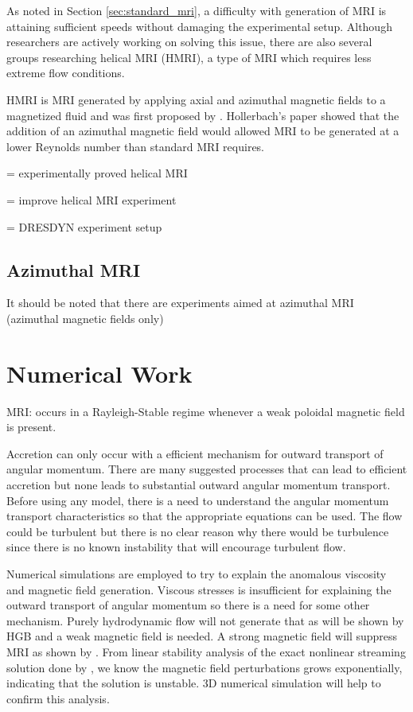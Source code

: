\documentclass{jfm}
\begin{document}
As noted in Section \ref{sec:standard_mri}, a difficulty with generation of
MRI is attaining sufficient speeds without damaging the experimental setup. 
Although researchers are actively working on solving this issue, there are also
several groups researching helical MRI (HMRI), a type of MRI which requires 
less extreme flow conditions.

HMRI is MRI generated by applying axial and azimuthal magnetic fields to a 
magnetized fluid and was first proposed by \cite{Hollerbach2005}. Hollerbach's
paper showed that the addition of an azimuthal magnetic field would allowed MRI
to be generated at a lower Reynolds number than standard MRI requires.


\cite{Stefani2006, Stefani2007}  = experimentally proved helical MRI

\cite{Stefani2009} = improve helical MRI experiment

\cite{Stefani2012} = DRESDYN experiment setup


%
%
\subsection{Azimuthal MRI}

It should be noted that there are experiments aimed at azimuthal MRI (azimuthal magnetic fields only)




\section{Numerical Work}

MRI: occurs in a Rayleigh-Stable regime whenever a weak poloidal magnetic 
field is present.

Accretion can only occur with a efficient mechanism for outward transport of 
angular momentum. There are many suggested processes that can lead to efficient
accretion but none leads to substantial outward angular momentum transport. 
Before using any model, there is a need to understand the angular momentum 
transport characteristics so that the appropriate equations can be used. The 
flow could be turbulent but there is no clear reason why there would be 
turbulence since there is no known instability that will encourage turbulent 
flow.

Numerical simulations are employed to try to explain the anomalous viscosity 
and magnetic field generation. Viscous stresses is insufficient for explaining 
the outward transport of angular momentum so there is a need for some other 
mechanism. Purely hydrodynamic flow will not generate that as will be shown by
HGB and a weak magnetic field is needed. A strong magnetic field will suppress
MRI as shown by \cite{Liu2008}. From linear stability analysis of the exact 
nonlinear streaming solution done by \cite{Goodman1994}, we know the magnetic
field perturbations grows exponentially, indicating that the solution is 
unstable. 3D numerical simulation will help to confirm this analysis.
\end{document}
